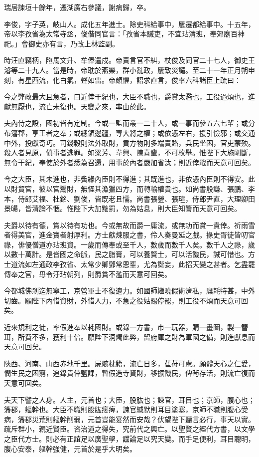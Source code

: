 \begin{pinyinscope}
瑞居諫垣十餘年，遷湖廣右參議，謝病歸，卒。

李俊，字子英，岐山人。成化五年進士。除吏科給事中，屢遷都給事中。十五年，帝以李孜省為太常寺丞，俊偕同官言：「孜省本贓吏，不宜玷清班，奉郊廟百神祀。」會御史亦有言，乃改上林監副。

時汪直竊柄，陷馬文升、牟俸遣戍。帝責言官不糾，杖俊及同官二十七人，御史王濬等二十九人。當是時，帝耽於燕樂，群小亂政，屢致災譴。至二十一年正月朔申刻，有星西流，化白氣，聲如雷。帝頗懼，詔求直言，俊率六科諸臣上疏曰：

今之弊政最大且急者，曰近倖干紀也，大臣不職也，爵賞太濫也，工役過煩也，進獻無厭也，流亡未復也。天變之來，率由於此。

夫內侍之設，國初皆有定制。今或一監而叢一二十人，或一事而參五六七輩；或分布籓郡，享王者之奉；或總領邊疆，專大將之權；或依憑左右，援引憸邪；或交通中外，投獻奇巧。司錢穀則法外取財，貢方物則多端責賂，兵民坐困，官吏蒙殃。殺人者見原，僨事者逃罪。如梁芳、韋興、陳喜輩，不可枚舉。惟陛下大施剛斷，無令干紀，奉使於外者悉為召還，用事於內者嚴加省汰；則近倖戢而天意可回矣。

今之大臣，其未進也，非夤緣內臣則不得進；其既進也，非依憑內臣則不得安。此以財貿官，彼以官鬻財，無怪其漁獵四方，而轉輸權貴也。如尚書殷謙、張鵬、李本，侍郎艾福、杜銘、劉俊，皆既老且懦。尚書張鎣、張瑄，侍郎尹直，大理卿田景暘，皆清論不愜。惟陛下大加黜罰，勿為姑息，則大臣知警而天意可回矣。

夫爵以待有德，賞以待有功也。今或無故而爵一庸流，或無功而賞一貴倖。祈雨雪者得美官，進金寶者射厚利。方士獻煉服之書，伶人奏曼延之戲。掾史胥徒皆叨官祿，俳優僧道亦玷班資。一歲而傳奉或至千人，數歲而數千人矣。數千人之祿，歲以數十萬計。是皆國之命脈，民之脂膏，可以養賢士，可以活饑民，誠可惜也。方士道流如左通政李孜省、太常少卿鄧常恩輩，尤為誕妄，此招天變之甚者。乞盡罷傳奉之官，毋令汙玷朝列，則爵賞不濫而天意可回矣。

今都城佛剎迄無寧工，京營軍士不復遺力。如國師繼曉假術濟私，糜耗特甚，中外切齒。願陛下內惜資財，外惜人力，不急之役姑賜停罷，則工役不煩而天意可回矣。

近來規利之徒，率假進奉以耗國財。或錄一方書，市一玩器，購一畫圖，製一簪珥，所費不多，獲利十倍。願陛下洞燭此弊，留府庫之財為軍國之備，則進獻息而天意可回矣。

陜西、河南、山西赤地千里。屍骸枕籍，流亡日多，萑苻可慮。願體天心之仁愛，憫生民之困窮，追錄貴倖鹽課，暫假造寺資財，移振饑民，俾茍存活，則流亡復而天意可回矣。

夫天下譬之人身。人主，元首也；大臣，股肱也；諫官，耳目也；京師，腹心也；籓郡，軀幹也。大臣不職則股肱痿痺，諫官緘默則耳目塗塞，京師不職則腹心受病，籓郡災荒則軀幹削弱，元首豈能宴然而安哉？伏望陛下聽言必行，事天以實。疏斥群小，親近賢臣。咨治道之得失，究前代之興亡。以聖賢之經代方書，以文學之臣代方士。則必有正誼足以廣聖學，讜論足以究天變。而手足便利，耳目聰明，腹心安泰，軀幹強健，元首於是乎大明矣。


\end{pinyinscope}
